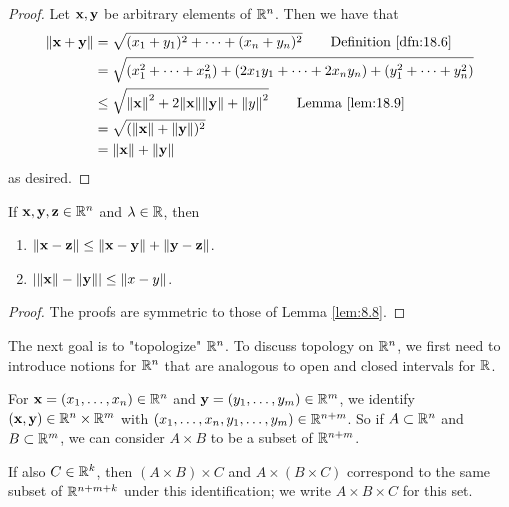 \documentclass[../main.tex]{subfiles}
\begin{document}
\begin{theorem}
\begin{enumerate}[label=\textup{(}\alph*\textup{)}]
\begin{proof}
            Let $\mathbf{x},\mathbf{y}$ be arbitrary elements of $\mathbb{R}^n$. Then we have that
            \begin{align*}
                \norm{\x+\y} &= \sqrt{(x_1+y_1)^2+\cdots+(x_n+y_n)^2}\tag*{Definition \ref{dfn:18.6}}\\
                &= \sqrt{(x_1^2+\cdots+x_n^2)+(2x_1y_1+\cdots+2x_ny_n)+(y_1^2+\cdots+y_n^2)}\\
                &\leq \sqrt{\norm{\x}^2+2\norm{\x}\norm{\y}+\norm{y}^2}\tag*{Lemma \ref{lem:18.9}}\\
                &= \sqrt{(\norm{\x}+\norm{\y})^2}\\
                &= \norm{\x}+\norm{\y}
            \end{align*}
            as desired.
        \end{proof}
    \end{enumerate}
\end{theorem}

\begin{corollary}\label{cly:18.11}
    If $\mathbf{x},\mathbf{y},\mathbf{z}\in\mathbb{R}^n$ and $\lambda\in\mathbb{R}$, then
    \begin{enumerate}[label=\textup{(}\alph*\textup{)}]
        \item $\norm{\mathbf{x}-\mathbf{z}}\leq\norm{\mathbf{x}-\mathbf{y}}+\norm{\mathbf{y}-\mathbf{z}}$.
        \item $|\norm{\mathbf{x}}-\norm{\mathbf{y}}|\leq\norm{x-y}$.
    \end{enumerate}
    \begin{proof}
        The proofs are symmetric to those of Lemma \ref{lem:8.8}.
    \end{proof}
\end{corollary}

The next goal is to "topologize" $\mathbb{R}^n$. To discuss topology on $\mathbb{R}^n$, we first need to introduce notions for $\mathbb{R}^n$ that are analogous to open and closed intervals for $\mathbb{R}$.

\begin{remark}\label{rmk:18.12}
    For $\mathbf{x}=(x_1,\dots,x_n)\in\mathbb{R}^n$ and $\mathbf{y}=(y_1,\dots,y_m)\in\mathbb{R}^m$, we identify $(\mathbf{x},\mathbf{y})\in\mathbb{R}^n\times\mathbb{R}^m$ with $(x_1,\dots,x_n,y_1,\dots,y_m)\in\mathbb{R}^{n+m}$. So if $A\subset\mathbb{R}^n$ and $B\subset\mathbb{R}^m$, we can consider $A\times B$ to be a subset of $\mathbb{R}^{n+m}$.\par
    If also $C\in\mathbb{R}^k$, then $(A\times B)\times C$ and $A\times(B\times C)$ correspond to the same subset of $\mathbb{R}^{n+m+k}$ under this identification; we write $A\times B\times C$ for this set.
\end{remark}
\end{document}
